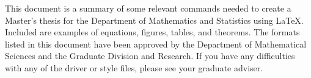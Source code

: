 

This document is a summary of some relevant commands needed to create
a Master's thesis for the Department of Mathematics and Statistics
using \LaTeX. Included are examples of equations, figures, tables, and
theorems. The formats listed in this document have been approved by
the Department of Mathematical Sciences and the Graduate Division and
Research.  If you have any difficulties with any of the driver or
style files, please see your graduate adviser.


